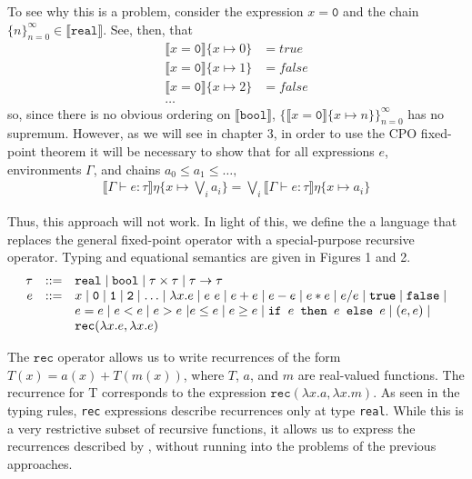 To see why this is a problem, consider the expression $x = \texttt{0}$ and the chain $\{n\}_{n=0}^{\infty} \in \llbracket 
\texttt{real} \rrbracket$. See, then, that
\begin{align*}
\llbracket x = \texttt{0} \rrbracket\{x \mapsto 0\} &= true \\
\llbracket x = \texttt{0} \rrbracket\{x \mapsto 1\} &= false \\
\llbracket x = \texttt{0} \rrbracket\{x \mapsto 2\} &= false \\
\ldots
\end{align*}
so, since there is no obvious ordering on $\llbracket \texttt{bool} \rrbracket$,
$\{\llbracket x = \texttt{0}\rrbracket\{x \mapsto n\}\}_{n=0}^{\infty}$ has no supremum. However, as we will see in chapter 3,
in order to use the CPO fixed-point theorem it will be necessary to show that for all expressions $e$, environments $\Gamma$,
and chains $a_0 \leq a_1 \leq \ldots,$
\begin{align*}
  \llbracket \Gamma \vdash e : \tau \rrbracket\eta\{x\mapsto \bigvee_i a_i\}
  = \bigvee_i \llbracket \Gamma \vdash e : \tau \rrbracket\eta\{x \mapsto a_i\}
\end{align*}

Thus, this approach will not work. In light of this, we define the a language that replaces the general fixed-point operator
with a special-purpose recursive operator. Typing and equational semantics are given in Figures 1 and 2.
\[
\begin{array}{rcl}
\tau &::=& \texttt{real} \mid \texttt{bool} \mid \tau \times \tau \mid \tau \rightarrow \tau \\
e &::=& x  \mid \texttt{0} \mid \texttt{1} \mid \texttt{2} \mid \dotsc \mid \lambda x.e \mid e \ e \mid e + e \mid e - e \mid  e  *  e \mid e / e \mid \texttt{true} \mid \texttt{false} \mid \\
  && e  =  e \mid e < e \mid e > e \ | e \leq e \mid e \geq e \mid 
     \texttt{if } e \texttt{ then } e \texttt{ else } e \mid (e,e) \mid \\
    && \texttt{rec}(\lambda x.e, \lambda x.e) 
\end{array}
\]

The $\texttt{rec}$ operator allows us to write 
recurrences of the form $T(x) = a(x) + T(m(x))$, where $T$, $a$, and $m$ are real-valued functions.
The recurrence for T corresponds to the expression $\texttt{rec}(\lambda x.a, \lambda x.m)$. As seen in the typing
rules, \texttt{rec} expressions describe recurrences only at type \texttt{real}.
 While this is a very restrictive subset of recursive functions, it allows us to express the recurrences described by 
 \cite[\S1]{Karp}, without running into the problems of the previous approaches. 

